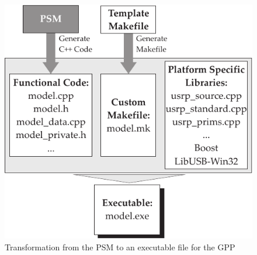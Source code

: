 \begin{figure}[htbp]
	\centering
		\includegraphics{../kapitel03/figures/codegener_GPP_USRP.pdf}
	\caption{Transformation from the \ac{PSM} to an executable file for the GPP}
	\label{fig:codegener_GPP_USRP}
\end{figure}




